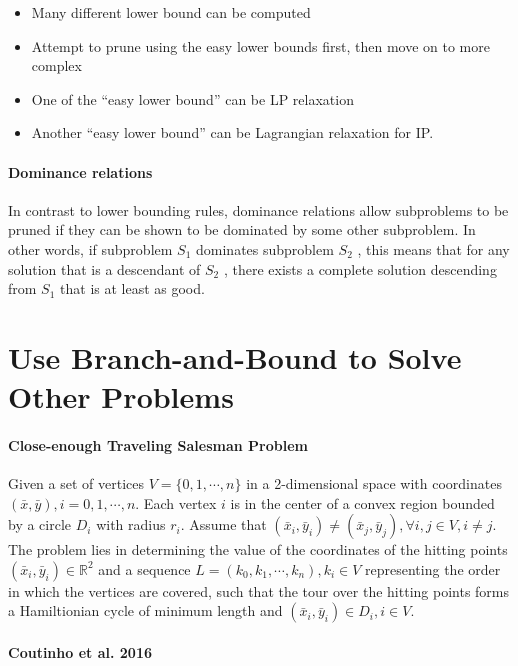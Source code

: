                    \begin{itemize}
                        \item Many different lower bound can be computed
                        \item Attempt to prune using the easy lower bounds first, then move on to more complex
                        \item One of the ``easy lower bound'' can be LP relaxation
                        \item Another ``easy lower bound'' can be Lagrangian relaxation for IP.
                    \end{itemize}

                \paragraph{Dominance relations}
                    In contrast to lower bounding rules, dominance relations allow subproblems to be pruned if they can be shown to be dominated by some other subproblem. In other words, if subproblem $S_1$ dominates subproblem $S_2$ , this means that for any solution that is a descendant of $S_2$ , there exists a complete solution descending from $S_1$ that is at least as good. 

        \section{Use Branch-and-Bound to Solve Other Problems}
            \paragraph{Close-enough Traveling Salesman Problem}
                Given a set of vertices $V = \{0, 1, \cdots, n\}$ in a 2-dimensional space with coordinates $(\bar{x}, \bar{y}), i = 0, 1, \cdots, n$. Each vertex $i$ is in the center of a convex region bounded by a circle $D_i$ with radius $r_i$. Assume that $(\bar{x}_i, \bar{y}_i) \neq (\bar{x}_j, \bar{y}_j), \forall i, j \in V, i \neq j$. The problem lies in determining the value of the coordinates of the hitting points $(\bar{x}_i, \bar{y}_i) \in \mathbb{R}^2$ and a sequence $L = (k_0, k_1, \cdots, k_n), k_i \in V$ representing the order in which the vertices are covered, such that the tour over the hitting points forms a Hamiltionian cycle of minimum length and $(\bar{x}_i, \bar{y}_i) \in D_i, i \in V$.

            \paragraph{Coutinho et al. 2016} 

